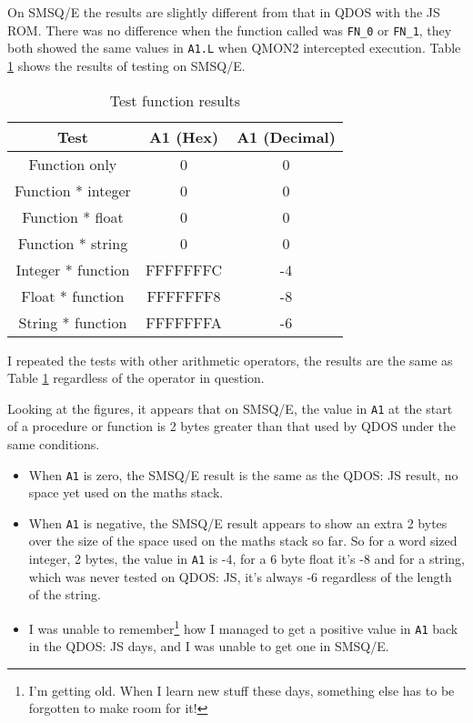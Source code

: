 On SMSQ/E the results are slightly different from that in QDOS with
the JS ROM. There was no difference when the function called was \texttt{FN\_0}
or \texttt{FN\_1}, they both showed the same values in \texttt{A1.L}
when QMON2 intercepted execution. Table \ref{tab:Test-function-results}
shows the results of testing on SMSQ/E.

\begin{table}[!h]
\begin{centering}
\begin{tabular}{|c|c|c|}
\hline 
\textbf{Test} & \textbf{A1 (Hex)} & \textbf{A1 (Decimal)}\tabularnewline
\hline 
\hline 
Function only & 0 & 0\tabularnewline
\hline 
Function {*} integer & 0 & 0\tabularnewline
\hline 
Function {*} float & 0 & 0\tabularnewline
\hline 
Function {*} string & 0 & 0\tabularnewline
\hline 
Integer {*} function & FFFFFFFC & -4\tabularnewline
\hline 
Float {*} function & FFFFFFF8 & -8\tabularnewline
\hline 
String {*} function & FFFFFFFA & -6\tabularnewline
\hline 
\end{tabular}
\par\end{centering}
\caption{Test function results\label{tab:Test-function-results}}

\end{table}

I repeated the tests with other arithmetic operators, the results
are the same as Table \ref{tab:Test-function-results} regardless
of the operator in question. 

Looking at the figures, it appears that on SMSQ/E, the value in \texttt{A1}
at the start of a procedure or function is 2 bytes greater than that
used by QDOS under the same conditions.
\begin{itemize}
\item When \texttt{A1} is zero, the SMSQ/E result is the same as the QDOS:
JS result, no space yet used on the maths stack.
\item When \texttt{A1} is negative, the SMSQ/E result appears to show an
extra 2 bytes over the size of the space used on the maths stack so
far. So for a word sized integer, 2 bytes, the value in \texttt{A1}
is -4, for a 6 byte float it's -8 and for a string, which was never
tested on QDOS: JS, it's always -6 regardless of the length of the
string.
\item I was unable to remember\footnote{I'm getting old. When I learn new stuff these days, something else
has to be forgotten to make room for it!} how I managed to get a positive value in \texttt{A1} back in the
QDOS: JS days, and I was unable to get one in SMSQ/E.
\end{itemize}

